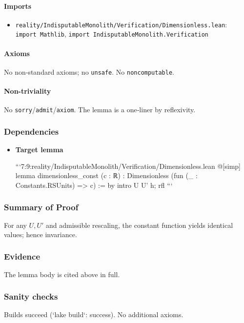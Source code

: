 \documentclass{article}
\newcommand{\FileRef}[1]{\texttt{#1}}
\begin{document}
\paragraph{Imports}
\begin{itemize}[leftmargin=*]
  \item \FileRef{reality/IndisputableMonolith/Verification/Dimensionless.lean}: \texttt{import Mathlib}, \texttt{import IndisputableMonolith.Verification}
\end{itemize}

\paragraph{Axioms}
No non‑standard axioms; no \texttt{unsafe}. No \texttt{noncomputable}.

\paragraph{Non-triviality}
No \texttt{sorry}/\texttt{admit}/\texttt{axiom}. The lemma is a one‑liner by reflexivity.

\subsubsection{Dependencies}
\begin{itemize}[leftmargin=*]
  \item \textbf{Target lemma}

```7:9:reality/IndisputableMonolith/Verification/Dimensionless.lean
@[simp] lemma dimensionless_const (c : ℝ) : Dimensionless (fun (_ : Constants.RSUnits) => c) := by
  intro U U' h; rfl
```
\end{itemize}

\subsubsection{Summary of Proof}
For any \(U,U'\) and admissible rescaling, the constant function yields identical values; hence invariance.

\subsubsection{Evidence}
The lemma body is cited above in full.

\subsubsection{Sanity checks}
Builds succeed (`lake build`: success). No additional axioms.
\end{document}

